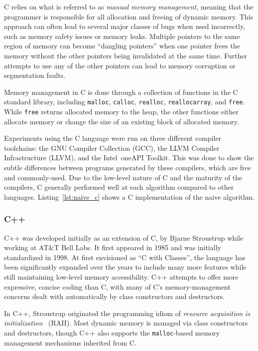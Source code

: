 C relies on what is referred to as \textit{manual memory management}, meaning that the programmer is responsible for all allocation and freeing of dynamic memory. This approach can often lead to several major classes of bugs when used incorrectly, such as memory safety issues or memory leaks. Multiple pointers to the same region of memory can become ``dangling pointers'' when one pointer frees the memory without the other pointers being invalidated at the same time. Further attempts to use any of the other pointers can lead to memory corruption or segmentation faults.

Memory management in C is done through a collection of functions in the C standard library, including \texttt{malloc}, \texttt{calloc}, \texttt{realloc}, \texttt{reallocarray}, and \texttt{free}. While \texttt{free} returns allocated memory to the heap, the other functions either allocate memory or change the size of an existing block of allocated memory.

Experiments using the C language were run on three different compiler toolchains: the GNU Compiler Collection (GCC), the LLVM Compiler Infrastructure (LLVM), and the Intel\textregistered~oneAPI Toolkit. This was done to show the subtle differences between programs generated by these compilers, which are free and commonly-used. Due to the low-level nature of C and the maturity of the compilers, C generally performed well at each algorithm compared to other languages. Listing~\ref{lst:naive_c} shows a C implementation of the naive algorithm.



\subsubsection{C++}

C++ was developed initially as an extension of C, by Bjarne Stroustrup while working at AT\&T Bell Labs. It first appeared in 1985 and was initially standardized in 1998. At first envisioned as ``C with Classes'', the language has been significantly expanded over the years to include many more features while still maintaining low-level memory accessibility. C++ attempts to offer more expressive, concise coding than C, with many of C's memory-management concerns dealt with automatically by class constructors and destructors.

In C++, Stroustrup originated the programming idiom of \textit{resource acquisition is initialization}~\cite{cpp} (RAII). Most dynamic memory is managed via class constructors and destructors, though C++ also supports the \texttt{malloc}-based memory management mechanisms inherited from C.

